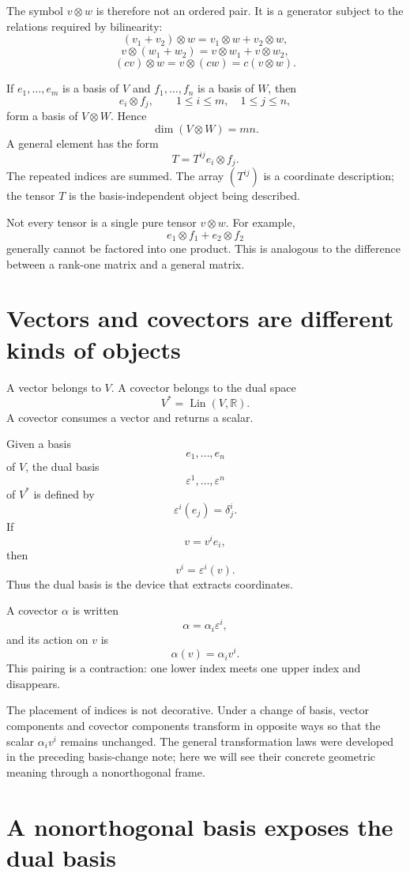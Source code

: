 The symbol \(v\otimes w\) is therefore not an ordered pair.  It is a generator subject to the relations required by bilinearity:
\[
  (v_1+v_2)\otimes w
  =v_1\otimes w+v_2\otimes w,
\]
\[
  v\otimes(w_1+w_2)
  =v\otimes w_1+v\otimes w_2,
\]
\[
  (cv)\otimes w
  =v\otimes(cw)
  =c(v\otimes w).
\]

If \(e_1,\ldots,e_m\) is a basis of \(V\) and \(f_1,\ldots,f_n\) is a basis of \(W\), then
\[
  e_i\otimes f_j,
  \qquad
  1\le i\le m,
  \quad
  1\le j\le n,
\]
form a basis of \(V\otimes W\).  Hence
\[
  \dim(V\otimes W)=mn.
\]
A general element has the form
\[
  T=T^{ij}e_i\otimes f_j.
\]
The repeated indices are summed.  The array \((T^{ij})\) is a coordinate description; the tensor \(T\) is the basis-independent object being described.

Not every tensor is a single pure tensor \(v\otimes w\).  For example,
\[
  e_1\otimes f_1+e_2\otimes f_2
\]
generally cannot be factored into one product.  This is analogous to the difference between a rank-one matrix and a general matrix.

\section{Vectors and covectors are different kinds of objects}

A vector belongs to \(V\).  A covector belongs to the dual space
\[
  V^*=\operatorname{Lin}(V,\mathbb R).
\]
A covector consumes a vector and returns a scalar.

Given a basis
\[
  e_1,\ldots,e_n
\]
of \(V\), the dual basis
\[
  \varepsilon^1,\ldots,\varepsilon^n
\]
of \(V^*\) is defined by
\[
  \varepsilon^i(e_j)=\delta^i_j.
\]
If
\[
  v=v^ie_i,
\]
then
\[
  v^i=\varepsilon^i(v).
\]
Thus the dual basis is the device that extracts coordinates.

A covector \(\alpha\) is written
\[
  \alpha=\alpha_i\varepsilon^i,
\]
and its action on \(v\) is
\[
  \alpha(v)=\alpha_iv^i.
\]
This pairing is a contraction: one lower index meets one upper index and disappears.

The placement of indices is not decorative.  Under a change of basis, vector components and covector components transform in opposite ways so that the scalar \(\alpha_iv^i\) remains unchanged.  The general transformation laws were developed in the preceding basis-change note; here we will see their concrete geometric meaning through a nonorthogonal frame.

\section{A nonorthogonal basis exposes the dual basis}

